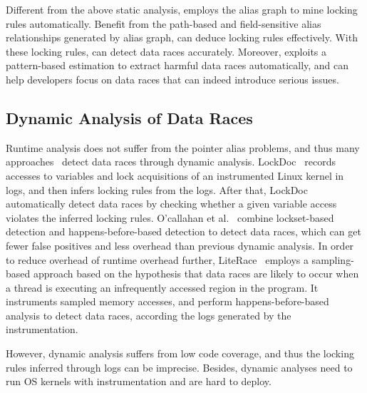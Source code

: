 Different from the above static analysis, \sys employs the alias graph to mine 
locking rules automatically. Benefit from the path-based and field-sensitive 
alias relationships generated by alias graph, \sys can deduce locking rules 
effectively. With these locking rules, \sys can detect data races accurately. 
Moreover, \sys exploits a pattern-based estimation to extract harmful data 
races automatically, and can help developers focus on data races that can 
indeed introduce serious issues.

\subsection{Dynamic Analysis of Data Races}
\label{subsec_dynamic}
Runtime analysis does not suffer from the pointer alias problems, and thus many 
approaches~\cite{Lochmann:EuroSys19, Lu:SOSP07, Lu:FSE18, Joshi:ASE08, 	
Liu:NSDI07, Ocallahan:PPoPP03, Serebryany:WBIA09, Marino:PLDI09} detect data 
races through dynamic analysis. LockDoc~\cite{Lochmann:EuroSys19} records 
accesses to variables and lock acquisitions of an instrumented Linux kernel in 
logs, and then infers locking rules from the logs. After that, LockDoc 
automatically detect data races by checking whether a given variable access 
violates the inferred locking rules. O'callahan et al.~\cite{Ocallahan:PPoPP03} 
combine lockset-based detection and happens-before-based detection to detect 
data races, which can get fewer false positives and less overhead than previous 
dynamic analysis. In order to reduce overhead of runtime overhead further, 
LiteRace~\cite{Marino:PLDI09} employs a sampling-based approach based on the 
hypothesis that data races are likely to occur when a thread is executing
an infrequently accessed region in the program. It instruments sampled memory 
accesses, and perform happens-before-based analysis to detect data races, 
according the logs generated by the instrumentation.

However, dynamic analysis suffers from low code coverage, and thus the locking 
rules inferred through logs can be imprecise. Besides, dynamic analyses need to 
run OS kernels with instrumentation and are hard to deploy.


